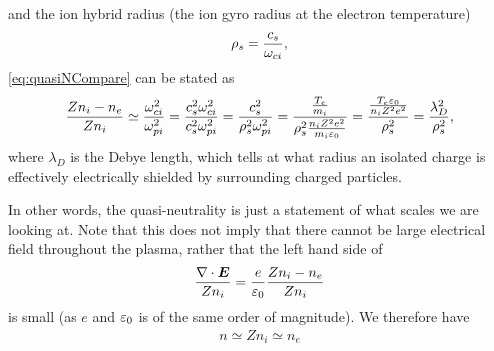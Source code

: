 %
and the ion hybrid radius (the ion gyro radius at the electron temperature)
%
\begin{align*}
   \rho_s=\frac{c_s}{\omega_{ci}},
\end  {align*}
%
\cref{eq:quasiNCompare} can be stated as
%
\begin{align*}
    \frac{Zn_i - n_e}{Zn_i}
    \simeq
    \frac{\omega_{ci}^2}{\omega_{pi}^2}
    =
    \frac{c_s^2\omega_{ci}^2}{c_s^2\omega_{pi}^2}
    =
    \frac{c_s^2}{\rho_s^2\omega_{pi}^2}
    =
    \frac{\frac{T_e}{m_i}}{\rho_s^2\frac{n_iZ^2e^2}{m_i\varepsilon_0}}
    =
    \frac{\frac{T_e\varepsilon_0}{n_iZ^2e^2}}{\rho_s^2}
    =
    \frac{\lambda_D^2}{\rho_s^2},
\end{align*}
%
where $\lambda_D$ is the Debye length, which tells at what radius an isolated charge is effectively electrically shielded by surrounding charged particles.

In other words, the quasi-neutrality is just a statement of what scales we are looking at.
Note that this does not imply that there cannot be large electrical field throughout the plasma, rather that the left hand side of
%
\begin{align*}
    \frac{\nabla\cdot \boldsymbol{E}}{Zn_i} = \frac{e}{\varepsilon_0} \frac{Zn_i-n_e}{Zn_i}
\end{align*}
%
is small (as $e$ and $\varepsilon_0$ is of the same order of magnitude).
We therefore have
%
\begin{align*}
    n\simeq Zn_i \simeq n_e
\end{align*}

